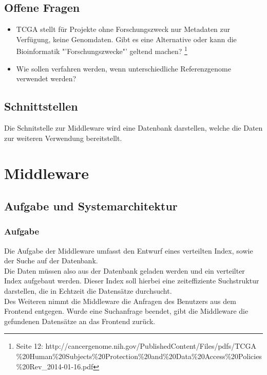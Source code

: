 \documentclass{scrartcl}
\begin{document}
\subsection{Offene Fragen}
\begin{itemize}
\item TCGA stellt für Projekte ohne Forschungszweck nur Metadaten zur Verfügung, keine Genomdaten. Gibt es eine Alternative oder kann die Bioinformatik "'Forschungszwecke"' geltend machen?
\footnote{\label{foot:5}Seite 12: http://cancergenome.nih.gov/PublishedContent/Files/pdfs/TCGA
\\ \%20Human\%20Subjects\%20Protection\%20and\%20Data\%20Access\%20Policies \\ \%20Rev\_2014-01-16.pdf}
\item Wie sollen verfahren werden, wenn unterschiedliche Referenzgenome verwendet werden?
\end{itemize}
\subsection{Schnittstellen}
Die Schnitstelle zur Middleware wird eine Datenbank darstellen, welche die Daten zur weiteren Verwendung bereitstellt.

\newpage
\section{Middleware}
\subsection{Aufgabe und Systemarchitektur}
\subsubsection{Aufgabe}
Die Aufgabe der Middleware umfasst den Entwurf eines verteilten Index, sowie der Suche auf der Datenbank.\\
Die Daten müssen also aus der Datenbank geladen werden und ein verteilter Index aufgebaut werden. Dieser Index soll hierbei eine zeiteffiziente Suchstruktur darstellen, die in Echtzeit die Datensätze durchsucht. \\Des Weiteren nimmt die Middleware die Anfragen des Benutzers aus dem Frontend entgegen.
Wurde eine Suchanfrage beendet, gibt die Middleware die gefundenen Datensätze an das Frontend zurück.
\end{document}
